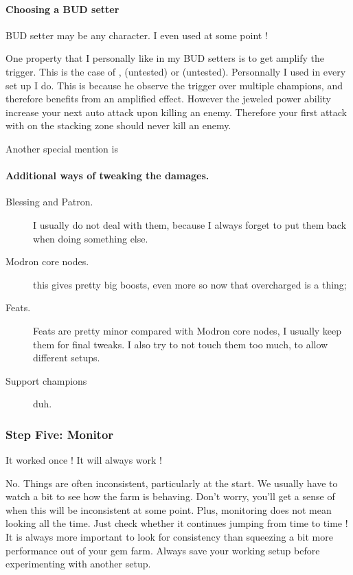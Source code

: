 \documentclass{article}
\begin{document}
\paragraph{Choosing a BUD setter}
BUD setter may be any character.
I even used \nerys at some point !

One property that I personally like in my BUD setters is to get amplify the trigger.
This is the case of \artemis, \arkhan (untested) or \blackViper (untested).
Personnally I used \artemis in every set up I do.
This is because he observe the trigger over multiple champions, and therefore benefits from an amplified effect.
However the jeweled power ability increase your next auto attack upon killing an enemy.
Therefore your first attack with \artemis on the stacking zone should never kill an enemy.

Another special mention is \nahara

\paragraph{Additional ways of tweaking the damages.}

\begin{description}
    \item[Blessing and Patron.] I usually do not deal with them, because I always forget to put them back when doing something else.
    \item[Modron core nodes.] this gives pretty big boosts, even more so now that overcharged is a thing;
    \item[Feats.] Feats are pretty minor compared with Modron core nodes, I usually keep them for final tweaks.
    I also try to not touch them too much, to allow different setups.
    \item[Support champions] duh.
\end{description}


\subsubsection{Step Five: Monitor}
\label{sec:stepFive}

It worked once !\newline
It will always work !\newline

No.\newline
Things are often inconsistent, particularly at the start.
We usually have to watch a bit to see how the farm is behaving.
Don't worry, you'll get a sense of when this will be inconsistent at some point.
Plus, monitoring does not mean looking all the time.
Just check whether it continues jumping from time to time !
It is always more important to look for consistency than squeezing a bit more performance out of your gem farm.
Always save your working setup before experimenting with another setup.
\end{document}
